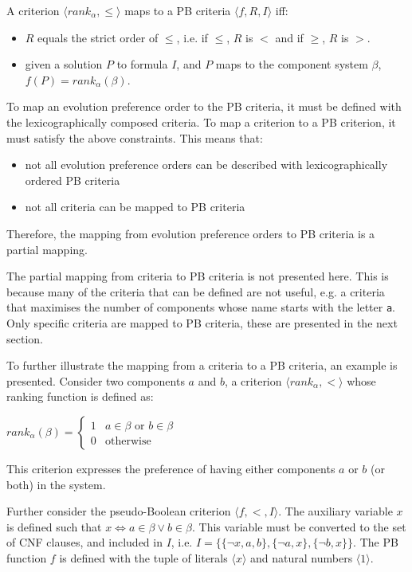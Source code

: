 A criterion $\langle rank_{\alpha} ,\leq \rangle$ maps to a PB criteria $\langle f, R , I \rangle$ iff:
\begin{itemize}
  \item $R$ equals the strict order of $\leq$, i.e. if $\leq$, $R$ is $<$ and if $\geq$, $R$ is $>$.
  \item given a solution $P$ to formula $I$, and $P$ maps to the component system $\beta$, $f(P) = rank_{\alpha}(\beta)$. 
\end{itemize} 

To map an evolution preference order to the PB criteria,
it must be defined with the lexicographically composed criteria.
To map a \modelname criterion to a PB criterion, it must satisfy the above constraints.
This means that:
\begin{itemize}
  \item not all evolution preference orders can be described with lexicographically ordered PB criteria
  \item not all \modelname criteria can be mapped to PB criteria
\end{itemize} 
Therefore, the mapping from evolution preference orders to PB criteria is a partial mapping.

The partial mapping from \modelname criteria to PB criteria is not presented here.
This is because many of the \modelname criteria that can be defined are not useful, 
e.g. a criteria that maximises the number of components whose name starts with the letter \texttt{a}.
Only specific criteria are mapped to PB criteria, these are presented in the next section. 

To further illustrate the mapping from a \modelname criteria to a PB criteria, an example is presented.
Consider two components $a$ and $b$, a criterion $\langle rank_{\alpha},< \rangle$ whose ranking function is defined as:

$rank_{\alpha}(\beta) = \begin{cases} 1 & a \in \beta \text{ or } b \in \beta\\ 0 & \text{otherwise} \end{cases}$

This criterion expresses the preference of having either components $a$ or $b$ (or both) in the system.

Further consider the pseudo-Boolean criterion $\langle f, < , I \rangle$.
The auxiliary variable $x$ is defined such that $x \Leftrightarrow a \in \beta \vee b \in \beta$.
This variable must be  converted to the set of CNF clauses, and included in $I$,
i.e. $I = \{\{\neg x, a,b\}, \{\neg a,x\}, \{\neg b, x \}\}$.
The PB function $f$ is defined with the tuple of literals $\langle x \rangle$ and natural numbers $\langle 1 \rangle$.

